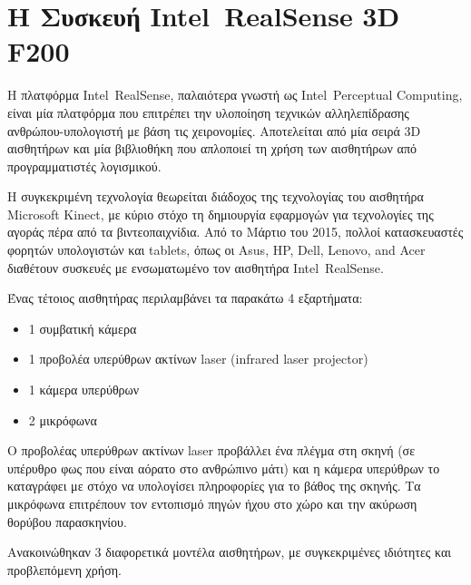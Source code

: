 \section{Η Συσκευή Intel\textregistered\ RealSense\texttrademark{} 3D F200 }


Η πλατφόρμα Intel\textregistered\ RealSense\texttrademark{}, παλαιότερα γνωστή ως Intel\textregistered\ Perceptual Computing, είναι μία πλατφόρμα που επιτρέπει την υλοποίηση τεχνικών αλληλεπίδρασης ανθρώπου-υπολογιστή με βάση τις χειρονομίες. Αποτελείται από μία σειρά 3D αισθητήρων και μία βιβλιοθήκη που απλοποιεί τη χρήση των αισθητήρων από προγραμματιστές λογισμικού. \cite{RealsenseCamera}


Η συγκεκριμένη τεχνολογία θεωρείται διάδοχος της τεχνολογίας του αισθητήρα Microsoft Kinect, με κύριο στόχο τη δημιουργία εφαρμογών για τεχνολογίες της αγοράς πέρα από τα βιντεοπαιχνίδια. Από το Μάρτιο του 2015, πολλοί κατασκευαστές φορητών υπολογιστών και tablets\cite{Realsenselaptops}, όπως οι Asus, HP, Dell, Lenovo, and Acer διαθέτουν συσκευές με ενσωματωμένο τον αισθητήρα Intel\textregistered\ RealSense\texttrademark{}. 


Ένας τέτοιος αισθητήρας περιλαμβάνει τα παρακάτω 4 εξαρτήματα: 


\begin{itemize}
  \item 1 συμβατική κάμερα
  \item 1 προβολέα υπερύθρων ακτίνων laser (infrared laser projector)
  \item 1 κάμερα υπερύθρων
  \item 2 μικρόφωνα
\end{itemize}



Ο προβολέας υπερύθρων ακτίνων laser προβάλλει ένα πλέγμα στη σκηνή (σε υπέρυθρο φως που είναι αόρατο στο ανθρώπινο μάτι) και η κάμερα υπερύθρων το καταγράφει με στόχο να υπολογίσει πληροφορίες για το βάθος της σκηνής.
Τα μικρόφωνα επιτρέπουν τον εντοπισμό πηγών ήχου στο χώρο και την ακύρωση θορύβου παρασκηνίου.


Ανακοινώθηκαν 3 διαφορετικά μοντέλα αισθητήρων, με συγκεκριμένες ιδιότητες και προβλεπόμενη χρήση. 

